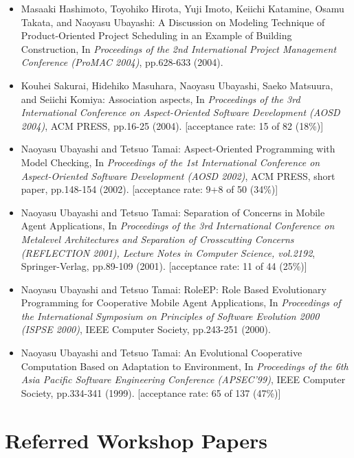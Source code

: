\documentclass{article}
\begin{document}
\begin{itemize}
\item Masaaki Hashimoto, Toyohiko Hirota, Yuji Imoto, Keiichi Katamine, Osamu Takata, and Naoyasu Ubayashi:
A Discussion on Modeling Technique of Product-Oriented Project Scheduling in an Example of Building Construction,
In {\em Proceedings of the 2nd International Project Management Conference (ProMAC 2004)},
pp.628-633 (2004).

\item Kouhei Sakurai, Hidehiko Masuhara, Naoyasu Ubayashi, Saeko Matsuura, and Seiichi Komiya:
Association aspects,
In {\em Proceedings of the 3rd International Conference on Aspect-Oriented Software Development (AOSD 2004)},
ACM PRESS,
pp.16-25 (2004).
[acceptance rate: 15 of 82 (18\%)]

\item Naoyasu Ubayashi and Tetsuo Tamai:
Aspect-Oriented Programming with Model Checking,
In {\em Proceedings of the 1st International Conference on Aspect-Oriented Software Development (AOSD 2002)},
ACM PRESS, short paper,
pp.148-154 (2002).
[acceptance rate: 9+8 of 50 (34\%)]

\item Naoyasu Ubayashi and Tetsuo Tamai:
Separation of Concerns in Mobile Agent Applications,
In {\em Proceedings of the 3rd International Conference on Metalevel Architectures and Separation of Crosscutting Concerns (REFLECTION 2001),
Lecture Notes in Computer Science, vol.2192}, Springer-Verlag,
pp.89-109 (2001).
[acceptance rate: 11 of 44 (25\%)]

\item Naoyasu Ubayashi and Tetsuo Tamai:
RoleEP: Role Based Evolutionary Programming for Cooperative Mobile Agent
Applications,
In {\em Proceedings of the International Symposium on Principles of Software Evolution 2000 (ISPSE 2000)},
IEEE Computer Society,
pp.243-251 (2000).

\item Naoyasu Ubayashi and Tetsuo Tamai:
An Evolutional Cooperative Computation
Based on Adaptation to Environment,
In {\em Proceedings of the 6th Asia Pacific Software Engineering Conference (APSEC'99)},
IEEE Computer Society,
pp.334-341 (1999).
[acceptance rate: 65 of 137 (47\%)]
\end{itemize}


\section{Referred Workshop Papers}
\end{document}
